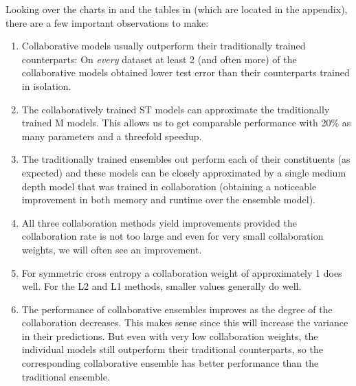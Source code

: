 \documentclass[english,a4paper,oneside]{amsart}
\theoremstyle{definition}
\begin{document}
Looking over the charts in  and the tables in  (which are located in the appendix), there are a few important observations to make:
\begin{enumerate}
	\item Collaborative models usually outperform their traditionally trained counterparts: On \emph{every} dataset at least 2 (and often more) of the collaborative models obtained lower test error than their counterparts trained in isolation.
	\item The collaboratively trained ST models can approximate the traditionally trained M models. This allows us to get comparable performance with 20\% as many parameters and a threefold speedup.
	\item The traditionally trained ensembles out perform each of their constituents (as expected) and these models can be closely approximated by a single medium depth model that was trained in collaboration (obtaining a noticeable improvement in both memory and runtime over the ensemble model).
	\item All three collaboration methods yield improvements provided the collaboration rate is not too large and even for very small collaboration weights, we will often see an improvement.
	\item For symmetric cross entropy a collaboration weight of approximately 1 does well. For the L2 and L1 methods, smaller values generally do well.
	\item The performance of collaborative ensembles improves as the degree of the collaboration decreases. This makes sense since this will increase the variance in their predictions. But even with very low collaboration weights, the individual models still outperform their traditional counterparts, so the corresponding collaborative ensemble has better performance than the traditional ensemble.
\end{enumerate}
\end{document}
